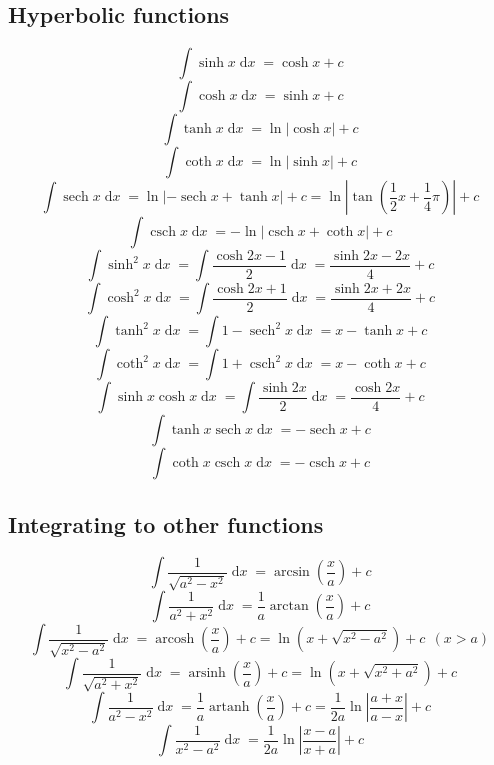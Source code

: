 \documentclass[fleqn, 11pt]{article}
\DeclareMathOperator\dx{\mathrm{d}\mathit{x}}
\DeclareMathOperator\sech{sech}
\DeclareMathOperator\csch{csch}
\DeclareMathOperator\arsinh{arsinh}
\DeclareMathOperator\arcosh{arcosh}
\DeclareMathOperator\artanh{artanh}
\begin{document}
	
	\subsection{Hyperbolic functions}
	\[\int\sinh x \dx = \cosh x + c\]
	\[\int\cosh x \dx = \sinh x + c\]
	\[\int \tanh x \dx = \ln |\cosh x| + c\]
	\[\int \coth x \dx = \ln |\sinh x| + c\]
	\[\int \sech x \dx = \ln |-\sech x + \tanh x| + c = \ln \left|\tan\left(\frac{1}{2}x+\frac{1}{4}\pi \right)\right| + c\]
	\[\int \csch x \dx = -\ln|\csch x + \coth x| + c\]
	\[\int \sinh^2 x \dx = \int \frac{\cosh 2x - 1}{2} \dx = \frac{\sinh 2x - 2x}{4} + c\]
	\[\int \cosh^2 x \dx = \int \frac{\cosh 2x + 1}{2} \dx = \frac{\sinh 2x + 2x}{4} + c\]
	\[\int \tanh^2 x \dx = \int 1-\sech^2 x \dx = x - \tanh x + c\]
	\[\int \coth^2 x \dx = \int 1+\csch^2 x \dx = x - \coth x + c\]
	\[\int \sinh x \cosh x \dx = \int \frac{\sinh 2x}{2} \dx = \dfrac{\cosh 2x}{4} + c\]
	\[\int \tanh x \sech x \dx = -\sech x + c\]
	\[\int \coth x \csch x \dx = -\csch x + c\]
	
	
	
	\subsection{Integrating to other functions}
	\[\int \frac{1}{\sqrt{a^2-x^2}} \dx=\arcsin \left(\frac{x}{a}\right) + c \]
	\[\int \frac{1}{a^2+x^2} \dx= \frac{1}{a}\arctan \left(\frac{x}{a}\right) + c \]
	\[\int \frac{1}{\sqrt{x^2-a^2}} \dx= \arcosh \left(\frac{x}{a}\right) + c = \ln \left(x + \sqrt{x^2-a^2}\right) + c \:\:  (x>a)\]
	\[\int \frac{1}{\sqrt{a^2+x^2}} \dx= \arsinh \left(\frac{x}{a}\right) + c = \ln \left(x + \sqrt{x^2+a^2}\right) + c \]
	\[\int \frac{1}{a^2-x^2} \dx=\frac{1}{a}\artanh \left(\frac{x}{a}\right) + c = \frac{1}{2a}\ln \left|\frac{a+x}{a-x}\right| + c\]
	\[\int \frac{1}{x^2-a^2} \dx= \frac{1}{2a}\ln \left|\frac{x-a}{x+a}\right| + c\]
	
	
	
	
\end{document}
